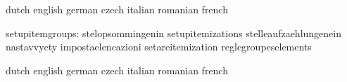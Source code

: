 
\startcommands                    dutch                            english
                                  german                           czech
                                  italian                          romanian
                                  french

                 setupitemgroups: stelopsommingenin                setupitemizations
                                  stelleaufzaehlungenein           nastavvycty
                                  impostaelencazioni               setareitemization
                                  reglegroupeselements

\stopcommands




\startcommands                    dutch                            english
                                  german                           czech
                                  italian                          romanian
                                  french

